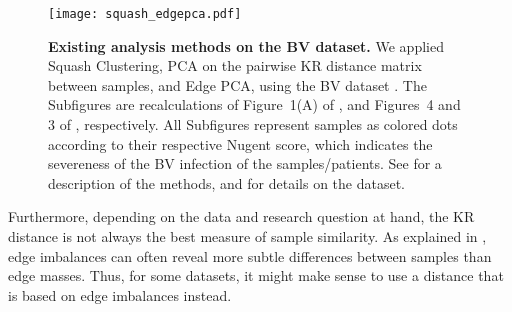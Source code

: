\begin{figure}[!htb]
    \centering
    \texttt{[image: squash\_edgepca.pdf]}
    \begin{subfigure}{0pt}
        \label{fig:squash_edgepca:sub:squash}
    \end{subfigure}
    \begin{subfigure}{0pt}
        \label{fig:squash_edgepca:sub:pca}
    \end{subfigure}
    \begin{subfigure}{0pt}
        \label{fig:squash_edgepca:sub:epca}
    \end{subfigure}
    \caption[Existing analysis methods on the BV dataset]{
        \textbf{Existing analysis methods on the BV dataset.}
        We applied  Squash Clustering,
         PCA on the pairwise KR distance matrix between samples,
        and  Edge PCA,
        using the \acf{BV} dataset \cite{Srinivasan2012}.
        The Subfigures are recalculations of Figure~1(A) of ,
        and Figures~4 and 3 of , respectively.
        All Subfigures represent samples as colored dots according to their respective Nugent score,
        which indicates the severeness of the \ac{BV} infection of the samples/patients.
        See  for a description of the methods,
        and  for details on the dataset.
    }
    \label{fig:squash_edgepca}
\end{figure}

Furthermore, depending on the data and research question at hand,
the KR distance is not always the best measure of sample similarity.
As explained in ,
edge imbalances can often reveal more subtle differences between samples than edge masses.
Thus, for some datasets, it might make sense to use a distance that is based on edge imbalances instead.

